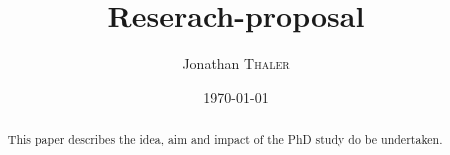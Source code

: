 \documentclass{article}
\title{Reserach-proposal} %
\author{Jonathan \textsc{Thaler}} %
\date{\today} %
\begin{document}
\maketitle %

\begin{abstract}
This paper describes the idea, aim and impact of the PhD study do be undertaken.
\end{abstract}


%



\newpage



\end{document}
